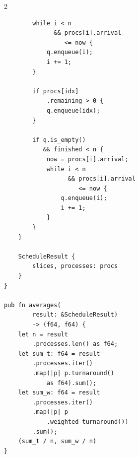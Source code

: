 {\begin{multicols}{2}
\begin{verbatim}
        while i < n
              && procs[i].arrival
                 <= now {
            q.enqueue(i);
            i += 1;
        }

        if procs[idx]
            .remaining > 0 {
            q.enqueue(idx);
        }

        if q.is_empty()
           && finished < n {
            now = procs[i].arrival;
            while i < n
                  && procs[i].arrival
                     <= now {
                q.enqueue(i);
                i += 1;
            }
        }
    }

    ScheduleResult {
        slices, processes: procs
    }
}

pub fn averages(
        result: &ScheduleResult)
        -> (f64, f64) {
    let n = result
        .processes.len() as f64;
    let sum_t: f64 = result
        .processes.iter()
        .map(|p| p.turnaround()
            as f64).sum();
    let sum_w: f64 = result
        .processes.iter()
        .map(|p| p
            .weighted_turnaround())
        .sum();
    (sum_t / n, sum_w / n)
}
\end{verbatim}

\end{multicols}
}
\vspace{0.5cm}
